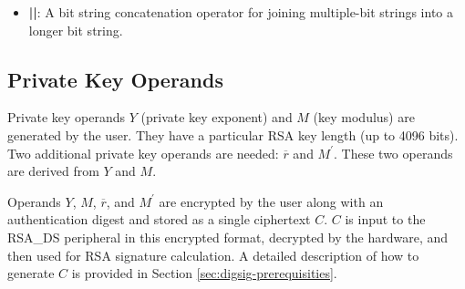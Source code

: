 \documentclass[main\_\_EN.tex]{subfiles}
\begin{document}
\begin{itemize}
       [0x05]\begin{math}_{16} = 00000101 00000000\end{math},
       [0x0005]\begin{math}_{16} = 00000000 00000101\end{math},
       [0x13]\begin{math}_{8} = 00010011\end{math},
       [0x13]\begin{math}_{16} = 00010011 00000000\end{math},
       [0x0013]\begin{math}_{16} = 00000000 00010011\end{math}.

    \item {\bfseries ||}:
       A bit string concatenation operator for joining multiple-bit strings into a longer bit string.
\end{itemize}

\subsection{Private Key Operands}
\label{sec:digsig-private-key-operands}

Private key operands \begin{math}Y\end{math} (private key exponent) and \begin{math}M\end{math} (key modulus) are generated by the user. They have a particular RSA key length (up to 4096 bits).
Two additional private key operands are needed: \begin{math}\overline{r}\end{math} and \begin{math}M^{\prime}\end{math}. These two operands are derived from \begin{math}Y\end{math} and \begin{math}M\end{math}.

Operands \begin{math}Y\end{math}, \begin{math}M\end{math}, \begin{math}\overline{r}\end{math}, and \begin{math}M^{\prime}\end{math} are encrypted by the user along with an authentication digest and stored as a single ciphertext \begin{math}C\end{math}. \begin{math}C\end{math} is input to the RSA\_DS peripheral in this encrypted format, decrypted by the hardware, and then used for RSA signature calculation. A detailed description of how to generate \begin{math}C\end{math} is provided in Section \ref{sec:digsig-prerequisities}.
\end{document}
